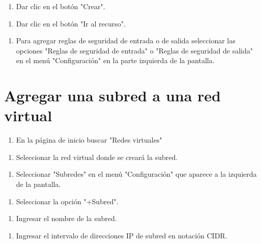 \begin{enumerate}
\item Dar clic en el botón "Crear".
\end{enumerate}

\begin{enumerate}
\item Dar clic en el botón "Ir al recurso".
\end{enumerate}

\begin{enumerate}
\item Para agregar reglas de seguridad de entrada o de salida seleccionar las opciones "Reglas de seguridad de entrada" o "Reglas de seguridad de salida" en el menú "Configuración" en la parte izquierda de la pantalla.
\end{enumerate}

\section{Agregar una subred a una red virtual}

\begin{enumerate}
\item En la página de inicio buscar "Redes virtuales"
\end{enumerate}

\begin{enumerate}
\item Seleccionar la red virtual donde se creará la subred.
\end{enumerate}

\begin{enumerate}
\item Seleccionar "Subredes" en el menú "Configuración" que aparece a la izquierda de la pantalla.
\end{enumerate}

\begin{enumerate}
\item Seleccionar la opción "+Subred".
\end{enumerate}

\begin{enumerate}
\item Ingresar el nombre de la subred.
\end{enumerate}

\begin{enumerate}
\item Ingresar el intervalo de direcciones IP de subred en notación CIDR.
\end{enumerate}

